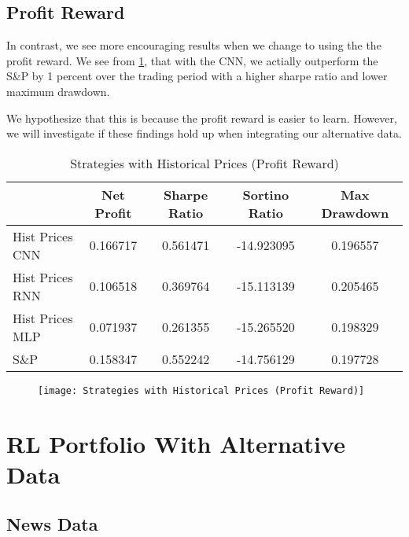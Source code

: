     \subsection{Profit Reward}

    In contrast, we see more encouraging results when we change to using the the profit reward. We see from \ref{tab:rl_strategies_profit}, that with the CNN, we actially outperform the S\&P by 1 percent over the trading period with a higher sharpe ratio and lower maximum drawdown.

    We hypothesize that this is because the profit reward is easier to learn. However, we will investigate if these findings hold up when integrating our alternative data.

    \begin{table}[htbp]
        \centering
        \caption{Strategies with Historical Prices (Profit Reward)}
          \begin{tabular}{lcccc}
          \toprule
                & Net Profit & Sharpe Ratio & Sortino Ratio & Max Drawdown \\
          \midrule
          Hist Prices CNN & 0.166717 & 0.561471 & -14.923095 & 0.196557 \\
          Hist Prices RNN & 0.106518 & 0.369764 & -15.113139 & 0.205465 \\
          Hist Prices MLP & 0.071937 & 0.261355 & -15.265520 & 0.198329 \\
          S\&P   & 0.158347 & 0.552242 & -14.756129 & 0.197728 \\
          \bottomrule
          \end{tabular}%
        \label{tab:rl_strategies_profit}%
      \end{table}%

    \begin{center}
        \begin{figure}
        \texttt{[image: Strategies with Historical Prices (Profit Reward)]}
        \end{figure}
        \end{center}

\section{RL Portfolio With Alternative Data}

\subsection{News Data}


